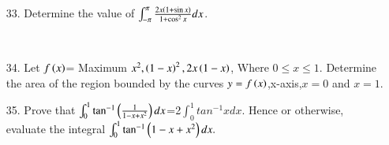 \documentclass[journal,12pt,twocolumn]{IEEEtran}
\theoremstyle{remark}
\begin{document}
\begin{enumerate}
\hfill{}\\

\item[33.]  Determine the value of $\int_{-\pi}^{\pi}\frac{2x\left(1+\sin x\right)}{1+\cos ^2x}dx$.


\hfill{}\\

\item[34.]  Let $f\left(x\right)$= Maximum {$x^2,\left(1-x\right)^2,2x\left(1-x\right)$}, Where $0 \leq x \leq 1$. Determine the area of the region bounded by the curves $y=f\left(x\right)$,x-axis,$x=0$ and $x=1$.
\hfill{}\\
\item[35.]  Prove that $\int_{0}^{1}\tan ^{-1}\left(\frac{1}{1-x+x^2}\right)dx$=2$\int_{0}^{1} tan^{-1}xdx$. Hence or otherwise, evaluate the integral $\int_{0}^{1}\tan ^{-1}\left(1-x+x^2\right)dx.$\\
\hfill{}

\end{enumerate}
\end{document}
